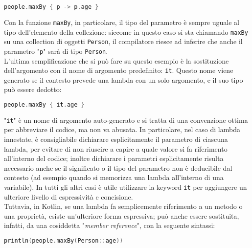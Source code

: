 \begin{lstlisting}[caption={Rimozione della specificazione di tipo dalla lambda}, captionpos=b, label={lst:exAmpleLambdamaxByNoType}, language=Kotlin]
people.maxBy { p -> p.age }
\end{lstlisting}

Con la funzione \texttt{maxBy}, in particolare, il tipo del parametro è sempre uguale al tipo dell'elemento della collezione: siccome in questo caso si sta chiamando \texttt{maxBy} su una collection di oggetti \texttt{Person}, il compilatore riesce ad inferire che anche il parametro "\texttt{p}" sarà di tipo \texttt{Person}.\\
L'ultima semplificazione che si può fare su questo esempio è la sostituzione dell'argomento con il nome di argomento predefinito: \texttt{it}. Questo nome viene generato se il contesto prevede una lambda con un solo argomento, e il suo tipo può essere dedotto:\\

\begin{lstlisting}[caption={Utilizzo della kewyword "it" all'interno della lambda}, captionpos=b, label={lst:exAmpleLambdamaxByIt}, language=Kotlin]
people.maxBy { it.age }
\end{lstlisting}

"\texttt{it}" è un nome di argomento auto-generato e si tratta di una convenzione ottima per abbreviare il codice, ma non va abusata. In particolare, nel caso di lambda innestate, è consigliabile dichiarare esplicitamente il parametro di ciascuna lambda, per evitare di non riuscire a capire a quale valore si fa riferimento all'interno del codice; inoltre dichiarare i parametri esplicitamente risulta necessario anche se il significato o il tipo del parametro non è deducibile dal contesto (ad esempio quando si memorizza una lambda all'interno di una variabile). In tutti gli altri casi è utile utilizzare la keyword \texttt{it} per aggiungere un ulteriore livello di espressività e concisione.\\
Tuttavia, in Kotlin, se una lambda fa semplicemente riferimento a un metodo o una proprietà, esiste un'ulteriore forma espressiva; può anche essere sostituita, infatti, da una cosiddetta "{\em member reference}", con la seguente sintassi:\\

\begin{lstlisting}[caption={Member reference}, captionpos=b, label={lst:exAmpleLambdaMember}, language=Kotlin]
println(people.maxBy(Person::age))
\end{lstlisting}

